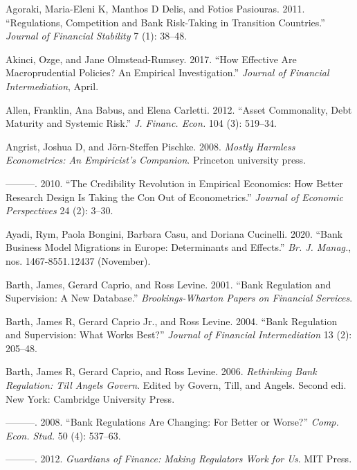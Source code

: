 \documentclass[
  10pt,
]{article}
\begin{document}
\leavevmode\hypertarget{ref-Agoraki2011}{}%
Agoraki, Maria-Eleni K, Manthos D Delis, and Fotios Pasiouras. 2011.
``Regulations, Competition and Bank Risk-Taking in Transition
Countries.'' \emph{Journal of Financial Stability} 7 (1): 38--48.

\leavevmode\hypertarget{ref-Akinci2017}{}%
Akinci, Ozge, and Jane Olmstead-Rumsey. 2017. ``How Effective Are
Macroprudential Policies? An Empirical Investigation.'' \emph{Journal of
Financial Intermediation}, April.

\leavevmode\hypertarget{ref-Allen2012}{}%
Allen, Franklin, Ana Babus, and Elena Carletti. 2012. ``Asset
Commonality, Debt Maturity and Systemic Risk.'' \emph{J. Financ. Econ.}
104 (3): 519--34.

\leavevmode\hypertarget{ref-angrist2008mostly}{}%
Angrist, Joshua D, and Jörn-Steffen Pischke. 2008. \emph{Mostly Harmless
Econometrics: An Empiricist's Companion}. Princeton university press.

\leavevmode\hypertarget{ref-angrist2010credibility}{}%
---------. 2010. ``The Credibility Revolution in Empirical Economics:
How Better Research Design Is Taking the Con Out of Econometrics.''
\emph{Journal of Economic Perspectives} 24 (2): 3--30.

\leavevmode\hypertarget{ref-Ayadi2020}{}%
Ayadi, Rym, Paola Bongini, Barbara Casu, and Doriana Cucinelli. 2020.
``Bank Business Model Migrations in Europe: Determinants and Effects.''
\emph{Br. J. Manag.}, nos. 1467-8551.12437 (November).

\leavevmode\hypertarget{ref-Barth2001}{}%
Barth, James, Gerard Caprio, and Ross Levine. 2001. ``Bank Regulation
and Supervision: A New Database.'' \emph{Brookings-Wharton Papers on
Financial Services}.

\leavevmode\hypertarget{ref-Barth2004}{}%
Barth, James R, Gerard Caprio Jr., and Ross Levine. 2004. ``Bank
Regulation and Supervision: What Works Best?'' \emph{Journal of
Financial Intermediation} 13 (2): 205--48.

\leavevmode\hypertarget{ref-Barth2006}{}%
Barth, James R, Gerard Caprio, and Ross Levine. 2006. \emph{Rethinking
Bank Regulation: Till Angels Govern}. Edited by Govern, Till, and
Angels. Second edi. New York: Cambridge University Press.

\leavevmode\hypertarget{ref-Barth2008}{}%
---------. 2008. ``Bank Regulations Are Changing: For Better or Worse?''
\emph{Comp. Econ. Stud.} 50 (4): 537--63.

\leavevmode\hypertarget{ref-Barth2012}{}%
---------. 2012. \emph{Guardians of Finance: Making Regulators Work for
Us}. MIT Press.
\end{document}
